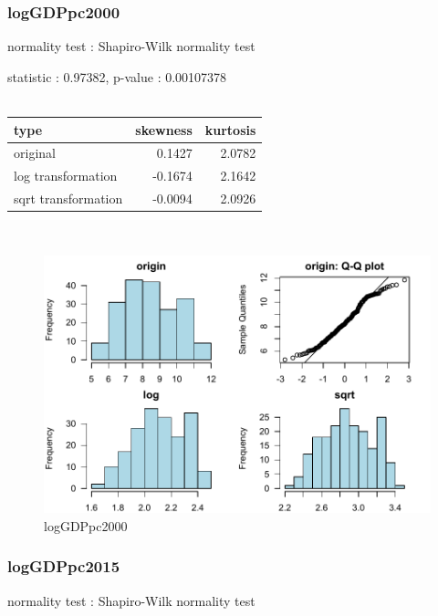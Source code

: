 \documentclass{book}\usepackage[]{graphicx}\usepackage[]{color}
\begin{document}
\subsubsection{ logGDPpc2000 }

normality test : Shapiro-Wilk normality test

\noindent statistic : 0.97382,  p-value : 0.00107378\\
\\%
\begin{tabular}{lrr}
  \toprule
type & skewness & kurtosis \\ 
  \midrule
original & 0.1427 & 2.0782 \\ 
  log transformation & -0.1674 & 2.1642 \\ 
  sqrt transformation & -0.0094 & 2.0926 \\ 
   \bottomrule
\end{tabular}
\\
\begin{figure}[!ht]
\centering
\includegraphics[width=1.0\textwidth]{figure/norm2.pdf}
\caption{logGDPpc2000}
\end{figure}
\clearpage
\subsubsection{ logGDPpc2015 }

normality test : Shapiro-Wilk normality test
\end{document}
